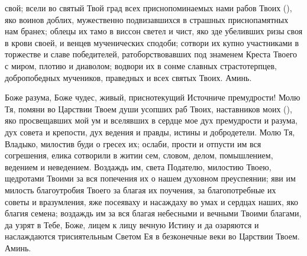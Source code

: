 \begin{mymulticols}
свой; всели во святый Твой град всех приснопоминаемых нами рабов Твоих (), яко воинов доблих, мужественно подвизавшихся в страшных приснопамятных нам бранех; облецы их тамо в виссон светел и чист, яко зде убеливших ризы своя в крови своей, и венцев мученических сподоби; сотвори их купно участниками в торжестве и славе победителей, ратоборствовавших под знаменем Креста Твоего с миром, плотию и диаволом; водвори их в сонме славных страстотерпцев, добропобедных мучеников, праведных и всех святых Твоих. Аминь. 

\end{mymulticols}

\mychapterending


\begin{mymulticols}
 


Боже разума, Боже чудес, живый, приснотекущий Источниче премудрости! Молю Тя, помяни во Царствии Твоем души усопших раб Твоих, наставников моих (), яко просвещавших мой ум и вселявших в сердце мое дух премудрости и разума, дух совета и крепости, дух ведения и правды, истины и добродетели. Молю Тя, Владыко, милостив буди о гресех их; ослаби, прости и отпусти им вся согрешения, елика сотворили в житии сем, словом, делом, помышлением, ведением и неведением. Воздаждь им, света Подателю, милостию Твоею, щедротами Твоими за вся попечения их о нашем духовном преуспеянии; яви им милость благоутробия Твоего за благая их поучения, за благопотребные их советы и вразумления, яже посеяваху и насаждаху во умах и сердцах наших, яко благия семена; воздаждь им за вся благая небесными и вечными Твоими благами, да узрят в Тебе, Боже, лицем к лицу вечную Истину и да озаряются и наслаждаются трисиятельным Светом Ея в безконечные веки во Царствии Твоем. Аминь. 

\end{mymulticols}

\mychapterending


